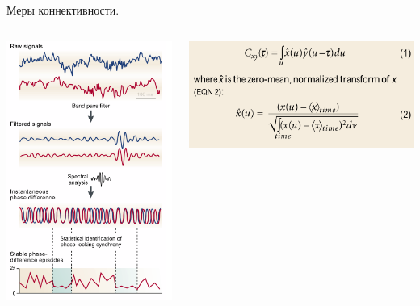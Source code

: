 \documentclass[12pt]{beamer}
\begin{document}
\begin{frame}[t]{Меры коннективности.}
    \centering
    \begin{columns}
        \begin{column}{0.5\textwidth}
            \includegraphics[scale=0.4]{phase_sunchrony.png}
        \end{column}
        \begin{column}{0.5\textwidth}
            \includegraphics[scale=0.3]{correlation.png}


\end{column}
\end{columns}
\end{frame}
\end{document}
